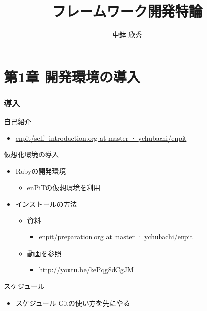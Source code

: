 \documentclass[t, aspectratio=169]{beamer}
\date{\insertpart}
\institute[AIIT]{産業技術大学院大学(AIIT)}
\author{中鉢 欣秀}
\date{}
\title{フレームワーク開発特論}
\begin{document}
\maketitle

\part{第1章 開発環境の導入}
\label{sec-1}
\section{導入}
\label{sec-1-1}
\begin{frame}[label=sec-1-1-1]{自己紹介}
\begin{itemize}
\item \href{https://github.com/ychubachi/enpit/blob/master/slides/self_introduction.org}{enpit/self\_introduction.org at master · ychubachi/enpit}
\end{itemize}
\end{frame}

\begin{frame}[label=sec-1-1-2]{仮想化環境の導入}
\begin{itemize}
\item Rubyの開発環境
\begin{itemize}
\item enPiTの仮想環境を利用
\end{itemize}
\item インストールの方法
\begin{itemize}
\item 資料
\begin{itemize}
\item \href{https://github.com/ychubachi/enpit/blob/master/slides/preparation.org}{enpit/preparation.org at master · ychubachi/enpit}
\end{itemize}
\item 動画を参照
\begin{itemize}
\item \url{http://youtu.be/kePqg8dCgJM}
\end{itemize}
\end{itemize}
\end{itemize}
\end{frame}

\begin{frame}[label=sec-1-1-3]{スケジュール}
\begin{itemize}
\item スケジュール
Gitの使い方を先にやる
\end{itemize}
\end{frame}
\end{document}
